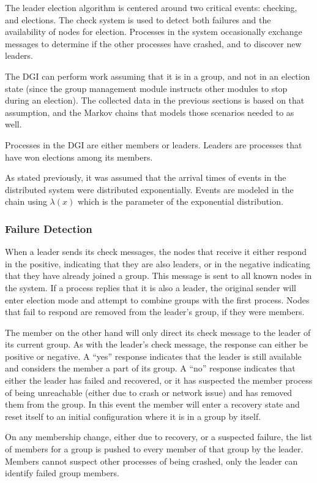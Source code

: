 The leader election algorithm is centered around two critical events: checking, and elections. The check system is used to detect both failures and the availability of nodes for election. Processes in the system occasionally exchange messages to determine if the other processes have crashed, and to discover new leaders.

The DGI can perform work assuming that it is in a group, and not in an election state (since the group management module instructs other modules to stop during an election). The collected data in the previous sections is based on that assumption, and the Markov chains that models those scenarios needed to as well.

Processes in the DGI are either members or leaders. Leaders are processes that have won elections among its members.

As stated previously, it was assumed that the arrival times of events in the distributed system were distributed exponentially. Events are modeled in the chain using $\lambda(x)$ which is the parameter of the exponential distribution. 

\subsubsection{Failure Detection}
When a leader sends its check messages, the nodes that receive it either respond in the positive, indicating that they are also leaders, or in the negative indicating that they have already joined a group. This message is sent to all known nodes in the system. If a process replies that it is also a leader, the original sender will enter election mode and attempt to combine groups with the first process. Nodes that fail to respond are removed from the leader's group, if they were members.

The member on the other hand will only direct its check message to the leader of its current group. As with the leader's check message, the response can either be positive or negative. A ``yes'' response indicates that the leader is still available and considers the member a part of its group. A ``no'' response indicates that either the leader has failed and recovered, or it has suspected the member process of being unreachable (either due to crash or network issue) and has removed them from the group. In this event the member will enter a recovery state and reset itself to an initial configuration where it is in a group by itself.

On any membership change, either due to recovery, or a suspected failure, the list of members for a group is pushed to every member of that group by the leader. Members cannot suspect other processes of being crashed, only the leader can identify failed group members.

